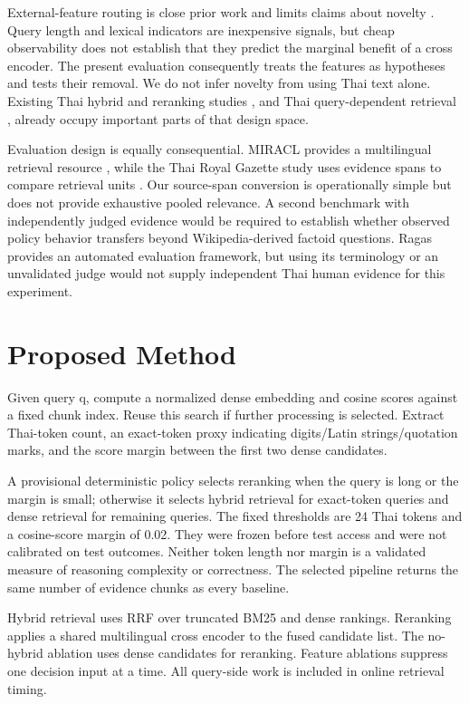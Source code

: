 \documentclass[10pt,a4paper]{article}
\begin{document}
External-feature routing is close prior work and limits claims about
novelty \citep{ref10}. Query length and lexical indicators are
inexpensive signals, but cheap observability does not establish that
they predict the marginal benefit of a cross encoder. The present
evaluation consequently treats the features as hypotheses and tests
their removal. We do not infer novelty from using Thai text alone.
Existing Thai hybrid and reranking studies \citep{ref14}, and Thai
query-dependent retrieval \citep{ref16}, already occupy important parts
of that design space.

Evaluation design is equally consequential. MIRACL provides a
multilingual retrieval resource \citep{ref11}, while the Thai Royal
Gazette study uses evidence spans to compare retrieval units
\citep{ref15}. Our source-span conversion is operationally simple but
does not provide exhaustive pooled relevance. A second benchmark with
independently judged evidence would be required to establish whether
observed policy behavior transfers beyond Wikipedia-derived factoid
questions. Ragas \citep{ref12} provides an automated evaluation
framework, but using its terminology or an unvalidated judge would not
supply independent Thai human evidence for this experiment.

\hypertarget{proposed-method}{%
\section{Proposed Method}\label{proposed-method}}

Given query q, compute a normalized dense embedding and cosine scores
against a fixed chunk index. Reuse this search if further processing is
selected. Extract Thai-token count, an exact-token proxy indicating
digits/Latin strings/quotation marks, and the score margin between the
first two dense candidates.

A provisional deterministic policy selects reranking when the query is
long or the margin is small; otherwise it selects hybrid retrieval for
exact-token queries and dense retrieval for remaining queries. The fixed
thresholds are 24 Thai tokens and a cosine-score margin of 0.02. They
were frozen before test access and were not calibrated on test outcomes.
Neither token length nor margin is a validated measure of reasoning
complexity or correctness. The selected pipeline returns the same number
of evidence chunks as every baseline.

Hybrid retrieval uses RRF over truncated BM25 and dense rankings.
Reranking applies a shared multilingual cross encoder to the fused
candidate list. The no-hybrid ablation uses dense candidates for
reranking. Feature ablations suppress one decision input at a time. All
query-side work is included in online retrieval timing.
\end{document}

